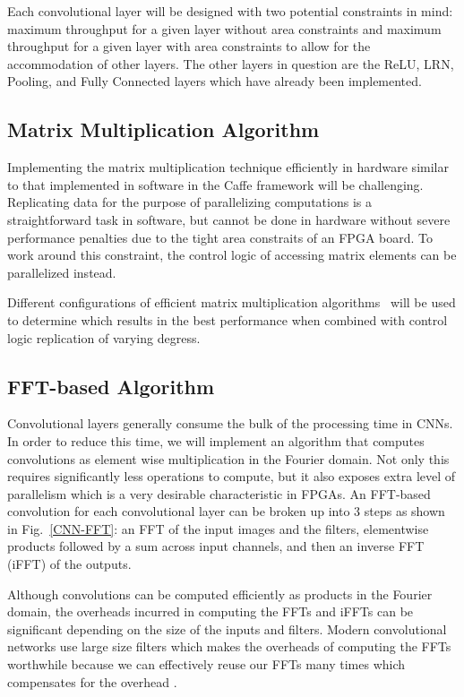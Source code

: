 \documentclass[conference,compsoc]{IEEEtran/IEEEtran}
\begin{document}
Each convolutional layer will be designed with two potential constraints in mind:
maximum throughput for a given layer without area constraints and maximum throughput
for a given layer with area constraints to allow for the accommodation of other
layers. The other layers in question are the ReLU, LRN, Pooling, and Fully Connected
layers which have already been implemented.

\subsection{Matrix Multiplication Algorithm}
Implementing the matrix multiplication technique efficiently in hardware similar to that implemented in software in the Caffe framework will be challenging.
Replicating data for the purpose of parallelizing computations is a straightforward task in software, but cannot be done in hardware without severe performance penalties due to the tight area constraits of an FPGA board.
To work around this constraint, the control logic of accessing matrix elements can be parallelized instead.

Different configurations of efficient matrix multiplication algorithms~\cite{MM_strassen,MM_efficient} will be used to determine which results in the best performance when combined with control logic replication of varying degress.

\subsection{FFT-based Algorithm}
Convolutional layers generally consume the bulk of the processing time in CNNs. In order to reduce this time, we will implement an algorithm that computes convolutions as element wise multiplication in the Fourier domain. Not only this requires significantly less operations to compute, but it also exposes extra level of parallelism which is a very desirable characteristic in FPGAs. An FFT-based convolution for each convolutional layer can be broken up into $3$ steps as shown in Fig.~\ref{CNN-FFT}: an FFT of the input images and the filters, elementwise products followed by a sum across input channels, and then an inverse FFT (iFFT) of the outputs.

Although convolutions can be computed efficiently as products in the Fourier domain, the overheads incurred in computing the FFTs and iFFTs can be significant depending on the size of the inputs and filters. Modern convolutional networks use large size filters which makes the overheads of computing the FFTs worthwhile because we can effectively reuse our FFTs many times which compensates for the overhead \cite{FFT1}.
\end{document}
